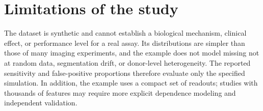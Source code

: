 \section{Limitations of the study}
The dataset is synthetic and cannot establish a biological mechanism, clinical
effect, or performance level for a real assay. Its distributions are simpler
than those of many imaging experiments, and the example does not model missing
not at random data, segmentation drift, or donor-level heterogeneity. The
reported sensitivity and false-positive proportions therefore evaluate only the
specified simulation. In addition, the example uses a compact set of readouts;
studies with thousands of features may require more explicit dependence modeling
and independent validation.

